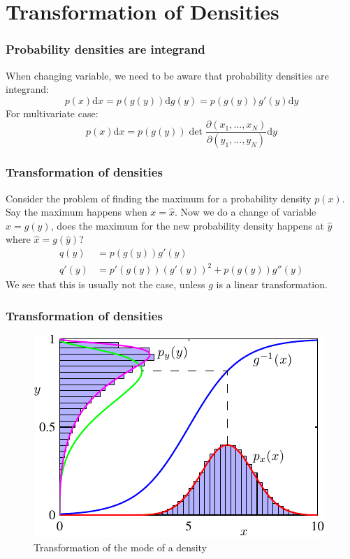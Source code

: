 \documentclass{beamer}
\begin{document}
\section{Transformation of Densities}

\begin{frame}
    \frametitle{Probability densities are integrand}
    When changing variable, we need to be aware that probability densities are integrand:
    \begin{equation*}
        p(x)\mathrm{d}x=p(g(y))\mathrm{d}g(y)=p(g(y))g'(y)\mathrm{d}y
    \end{equation*}
    For multivariate case:
    \begin{equation*}
        p(x)\mathrm{d}x=p(g(y))\det\frac{\partial(x_{1},\hdots,x_{N})}{\partial(y_{1},\hdots,y_{N})}\mathrm{d}y
    \end{equation*}
\end{frame}

\begin{frame}
    \frametitle{Transformation of densities}
    Consider the problem of finding the maximum for a probability density $p(x)$. Say the maximum happens when $x=\hat{x}$. Now we do a change of variable $x=g(y)$, does the maximum for the new probability density happens at $\hat{y}$ where $\hat{x}=g(\hat{y})$?
    \begin{align*}
        q(y)&=p(g(y))g'(y) \\
        q'(y)&=p'(g(y))(g'(y))^{2}+p(g(y))g''(y)
    \end{align*}
    We see that this is usually not the case, unless $g$ is a linear transformation.
\end{frame}

\begin{frame}
    \frametitle{Transformation of densities}
    \begin{figure}
        \caption{Transformation of the mode of a density}
        \includegraphics{Figure_12.pdf}
    \end{figure}
\end{frame}
\end{document}
